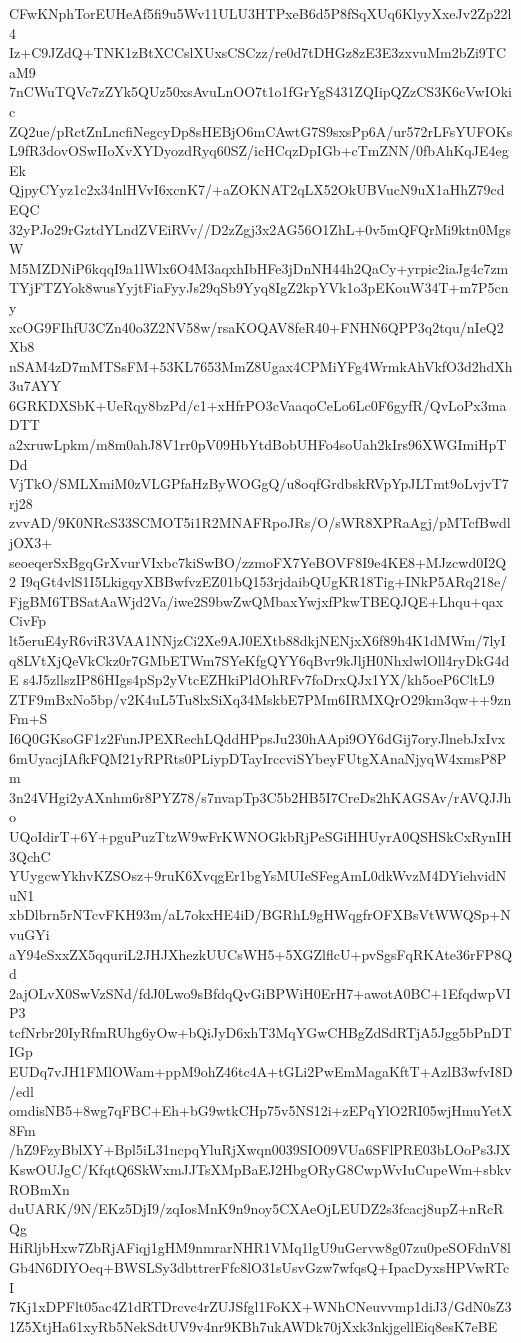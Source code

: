 CFwKNphTorEUHeAf5fi9u5Wv11ULU3HTPxeB6d5P8fSqXUq6KlyyXxeJv2Zp22l4
Iz+C9JZdQ+TNK1zBtXCCslXUxsCSCzz/re0d7tDHGz8zE3E3zxvuMm2bZi9TCaM9
7nCWuTQVc7zZYk5QUz50xsAvuLnOO7t1o1fGrYgS431ZQIipQZzCS3K6cVwIOkic
ZQ2ue/pRctZnLncfiNegcyDp8sHEBjO6mCAwtG7S9sxsPp6A/ur572rLFsYUFOKs
L9fR3dovOSwIIoXvXYDyozdRyq60SZ/icHCqzDpIGb+cTmZNN/0fbAhKqJE4egEk
QjpyCYyz1c2x34nlHVvI6xcnK7/+aZOKNAT2qLX52OkUBVucN9uX1aHhZ79cdEQC
32yPJo29rGztdYLndZVEiRVv//D2zZgj3x2AG56O1ZhL+0v5mQFQrMi9ktn0MgsW
M5MZDNiP6kqqI9a1lWlx6O4M3aqxhIbHFe3jDnNH44h2QaCy+yrpic2iaJg4c7zm
TYjFTZYok8wusYyjtFiaFyyJs29qSb9Yyq8IgZ2kpYVk1o3pEKouW34T+m7P5cny
xcOG9FIhfU3CZn40o3Z2NV58w/rsaKOQAV8feR40+FNHN6QPP3q2tqu/nIeQ2Xb8
nSAM4zD7mMTSsFM+53KL7653MmZ8Ugax4CPMiYFg4WrmkAhVkfO3d2hdXh3u7AYY
6GRKDXSbK+UeRqy8bzPd/c1+xHfrPO3cVaaqoCeLo6Lc0F6gyfR/QvLoPx3maDTT
a2xruwLpkm/m8m0ahJ8V1rr0pV09HbYtdBobUHFo4soUah2kIrs96XWGImiHpTDd
VjTkO/SMLXmiM0zVLGPfaHzByWOGgQ/u8oqfGrdbskRVpYpJLTmt9oLvjvT7rj28
zvvAD/9K0NRcS33SCMOT5i1R2MNAFRpoJRs/O/sWR8XPRaAgj/pMTcfBwdljOX3+
seoeqerSxBgqGrXvurVIxbc7kiSwBO/zzmoFX7YeBOVF8I9e4KE8+MJzcwd0I2Q2
I9qGt4vlS1I5LkigqyXBBwfvzEZ01bQ153rjdaibQUgKR18Tig+INkP5ARq218e/
FjgBM6TBSatAaWjd2Va/iwe2S9bwZwQMbaxYwjxfPkwTBEQJQE+Lhqu+qaxCivFp
lt5eruE4yR6viR3VAA1NNjzCi2Xe9AJ0EXtb88dkjNENjxX6f89h4K1dMWm/7lyI
q8LVtXjQeVkCkz0r7GMbETWm7SYeKfgQYY6qBvr9kJljH0NhxlwlOll4ryDkG4dE
s4J5zllszIP86HIgs4pSp2yVtcEZHkiPldOhRFv7foDrxQJx1YX/kh5oeP6CltL9
ZTF9mBxNo5bp/v2K4uL5Tu8lxSiXq34MskbE7PMm6IRMXQrO29km3qw++9znFm+S
I6Q0GKsoGF1z2FunJPEXRechLQddHPpsJu230hAApi9OY6dGij7oryJlnebJxIvx
6mUyacjIAfkFQM21yRPRts0PLiypDTayIrccviSYbeyFUtgXAnaNjyqW4xmsP8Pm
3n24VHgi2yAXnhm6r8PYZ78/s7nvapTp3C5b2HB5I7CreDs2hKAGSAv/rAVQJJho
UQoIdirT+6Y+pguPuzTtzW9wFrKWNOGkbRjPeSGiHHUyrA0QSHSkCxRynIH3QchC
YUygcwYkhvKZSOsz+9ruK6XvqgEr1bgYsMUIeSFegAmL0dkWvzM4DYiehvidNuN1
xbDlbrn5rNTcvFKH93m/aL7okxHE4iD/BGRhL9gHWqgfrOFXBsVtWWQSp+NvuGYi
aY94eSxxZX5qquriL2JHJXhezkUUCsWH5+5XGZlflcU+pvSgsFqRKAte36rFP8Qd
2ajOLvX0SwVzSNd/fdJ0Lwo9sBfdqQvGiBPWiH0ErH7+awotA0BC+1EfqdwpVIP3
tcfNrbr20IyRfmRUhg6yOw+bQiJyD6xhT3MqYGwCHBgZdSdRTjA5Jgg5bPnDTIGp
EUDq7vJH1FMlOWam+ppM9ohZ46tc4A+tGLi2PwEmMagaKftT+AzlB3wfvI8D/edl
omdisNB5+8wg7qFBC+Eh+bG9wtkCHp75v5NS12i+zEPqYlO2RI05wjHmuYetX8Fm
/hZ9FzyBblXY+Bpl5iL31ncpqYluRjXwqn0039SIO09VUa6SFlPRE03bLOoPs3JX
KswOUJgC/KfqtQ6SkWxmJJTsXMpBaEJ2HbgORyG8CwpWvIuCupeWm+sbkvROBmXn
duUARK/9N/EKz5DjI9/zqIosMnK9n9noy5CXAeOjLEUDZ2s3fcacj8upZ+nRcRQg
HiRljbHxw7ZbRjAFiqj1gHM9nmrarNHR1VMq1lgU9uGervw8g07zu0peSOFdnV8l
Gb4N6DIYOeq+BWSLSy3dbttrerFfc8lO31sUsvGzw7wfqsQ+IpacDyxsHPVwRTcI
7Kj1xDPFlt05ac4Z1dRTDrcvc4rZUJSfgl1FoKX+WNhCNeuvvmp1diJ3/GdN0sZ3
1Z5XtjHa61xyRb5NekSdtUV9v4nr9KBh7ukAWDk70jXxk3nkjgellEiq8esK7eBE
